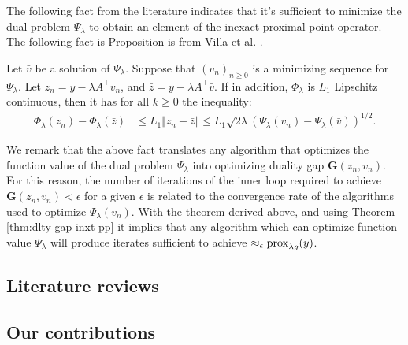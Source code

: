 \documentclass[12pt]{article}
\begin{document}
        The following fact from the literature indicates that it's sufficient to minimize the dual problem $\Psi_\lambda$ to obtain an element of the inexact proximal point operator. 
        The following fact is Proposition is from Villa et al. \cite[Theorem 5.1]{villa_accelerated_2013}. 
        \begin{fact}\label{fact:minimizing-dual-pp}
            Let $\bar v$ be a solution of $\Psi_\lambda$. 
            Suppose that $(v_n)_{n \ge 0}$ is a minimizing sequence for $\Psi_\lambda$. 
            Let $z_n = y - \lambda A^\top v_n$, and $\bar z = y - \lambda A^\top \bar v$. 
            If in addition, $\Phi_\lambda$ is $L_1$ Lipschitz continuous, then it has for all $k \ge 0$ the inequality: 
            \begin{align*}
                \Phi_{\lambda}(z_n) - \Phi_\lambda(\bar z) 
                &\le L_1 \Vert z_n - \bar z\Vert 
                \le L_1\sqrt{2\lambda}(\Psi_\lambda(v_n) - \Psi_\lambda(\bar v))^{1/2}. 
            \end{align*}
        \end{fact}
        We remark that the above fact translates any algorithm that optimizes the function value of the dual problem $\Psi_\lambda$ into optimizing duality gap $\mathbf G(z_n, v_n)$. 
        For this reason, the number of iterations of the inner loop required to achieve $\mathbf G(z_n, v_n) < \epsilon$ for a given $\epsilon$ is related to the convergence rate of the algorithms used to optimize $\Psi_\lambda(v_n)$. 
        With the theorem derived above, and using Theorem \ref{thm:dlty-gap-inxt-pp} it implies that any algorithm which can optimize function value $\Psi_\lambda$ will produce iterates sufficient to achieve $\approx_\epsilon \operatorname{prox}_{\lambda g}(y)$. 
    \subsection{Literature reviews}

    \subsection{Our contributions}
\end{document}
